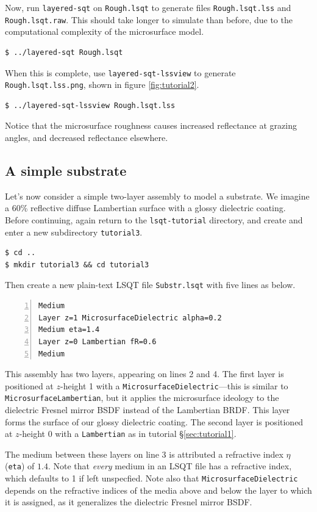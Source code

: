 \documentclass[
    twoside,
    twocolumn,
    letterpaper,
    10pt]{article}
\newcommand\namett[2]{{\color{code#1}\texttt{#2}}}
\begin{document}
Now, run \texttt{layered-sqt} on \texttt{Rough.lsqt} to generate
files \texttt{Rough.lsqt.lss} and \texttt{Rough.lsqt.raw}. This should take
longer to simulate than before, due to the computational complexity of the
microsurface model.
\begin{verbatim}
$ ../layered-sqt Rough.lsqt
\end{verbatim}
When this is complete, use \texttt{layered-sqt-lssview} to generate 
\texttt{Rough.lsqt.lss.png}, shown in figure \ref{fig:tutorial2}.
\begin{verbatim}
$ ../layered-sqt-lssview Rough.lsqt.lss
\end{verbatim}
Notice that the microsurface roughness causes increased reflectance at 
grazing angles, and decreased reflectance elsewhere.

\subsection{A simple substrate}
\label{sec:tutorial3}

Let's now consider a simple two-layer assembly to model a substrate. 
We imagine a 60\% reflective diffuse Lambertian surface with a glossy 
dielectric coating. Before continuing, again return to the 
\texttt{lsqt-tutorial} directory, and create and enter a new 
subdirectory \texttt{tutorial3}.
\begin{verbatim}
$ cd ..
$ mkdir tutorial3 && cd tutorial3
\end{verbatim}

Then create a new plain-text LSQT file \texttt{Substr.lsqt} with
five lines as below.
\begin{lstlisting}[numbers=left]
Medium
Layer z=1 MicrosurfaceDielectric alpha=0.2
Medium eta=1.4
Layer z=0 Lambertian fR=0.6
Medium
\end{lstlisting}
This assembly has two layers, appearing on lines 2 and 4. 
The first layer is positioned at $z$-height 1 with a 
\namett{purple}{MicrosurfaceDielectric}---this is similar to 
\namett{purple}{MicrosurfaceLambertian}, 
but it applies 
the microsurface ideology to the dielectric Fresnel mirror BSDF instead of 
the Lambertian BRDF. This layer forms the surface of our glossy dielectric 
coating.
The second layer is positioned at $z$-height 0 with a 
\namett{purple}{Lambertian} as in tutorial \S\ref{sec:tutorial1}.

The medium between these layers on line 3 is attributed a
refractive index $\eta$ (\texttt{eta}) of $1.4$. Note that 
\emph{every} medium in an LSQT
file has a refractive index, which defaults to 1 if left unspecfied. 
Note also that \namett{purple}{MicrosurfaceDielectric} depends on the
refractive indices of the media above and below the layer to which it is
assigned, as it generalizes the dielectric Fresnel mirror BSDF.
\end{document}
